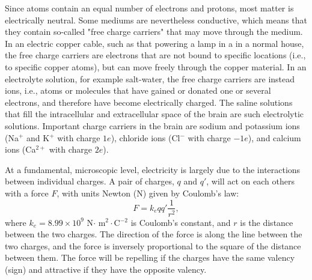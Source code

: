 Since atoms contain an equal number of electrons and protons, most matter is electrically neutral. Some mediums are nevertheless conductive, which means that they contain so-called "free charge carriers" that may move through the medium. In an electric copper cable, such as that powering a lamp in a in a normal house, the free charge carriers are electrons that are not bound to specific locations (i.e., to specific copper atoms), but can move freely through the copper material. In an electrolyte solution, for example salt-water, the free charge carriers are instead ions, i.e., atoms or molecules that have gained or donated one or several electrons, and therefore have become electrically charged. The saline solutions that fill the intracellular and extracellular space of the brain are such electrolytic solutions. Important charge carriers in the brain are sodium and potassium ions (Na$^+$ and K$^+$ with charge $1e$), chloride ions (Cl$^-$ with charge $-1e$), and calcium ions (Ca$^{2+}$ with charge $2e$).

At a fundamental, microscopic level, electricity is largely due to the interactions between individual charges. A pair of charges, $q$ and $q'$, 
will act on each others with a force $F$, with units Newton (N) given by Coulomb's law:
\begin{equation}
F = k_e qq' \frac{1}{r^2}, 
\label{Basics:eq:CoulombF}
\end{equation}
where $k_e = 8.99\times10^9$ N$\cdot$ m$^2\cdot$C$^{-2}$ is Coulomb's constant, and $r$ is the distance between the two charges. The direction of the force is along the line between the two charges, and the force is inversely proportional to the square of the distance between them. The force will be repelling if the charges have the same valency (sign) and attractive if they have the opposite valency. 

